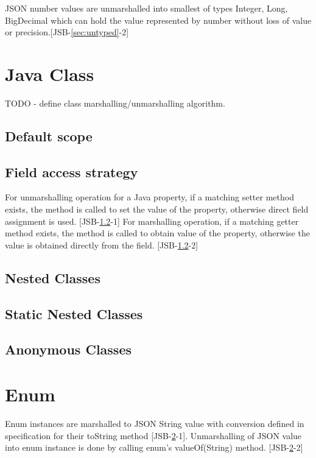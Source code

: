 JSON number values are unmarshalled into smallest of types Integer, Long, BigDecimal which can hold the value represented by number without loss of value or precision.[JSB-\ref{sec:untyped}-2]

\section{Java Class}
\label{sec:class}
TODO - define class marshalling/unmarshalling algorithm.

\subsection{Default scope}
\label{subsec:scopedefault}

\subsection{Field access strategy}
\label{subsec:fieldstrategy}
For unmarshalling operation for a Java property, if a matching setter method exists, the method is called to set the value of the property, otherwise direct field assignment is used. [JSB-\ref{subsec:fieldstrategy}-1] For marshalling operation, if a matching getter method exists, the method is called to obtain value of the property, otherwise the value is obtained directly from the field. [JSB-\ref{subsec:fieldstrategy}-2]

\subsection{Nested Classes}
\label{subsec:nestedclass}

\subsection{Static Nested Classes}
\label{subsec:staticnested}

\subsection{Anonymous Classes}
\label{subsec:anonymous}

\section{Enum}
\label{sec:enum}
Enum instances are marshalled to JSON String value with conversion defined in specification for their toString method [JSB-\ref{sec:enum}-1]. Unmarshalling of JSON value into enum instance is done by calling enum's valueOf(String) method. [JSB-\ref{sec:enum}-2]

